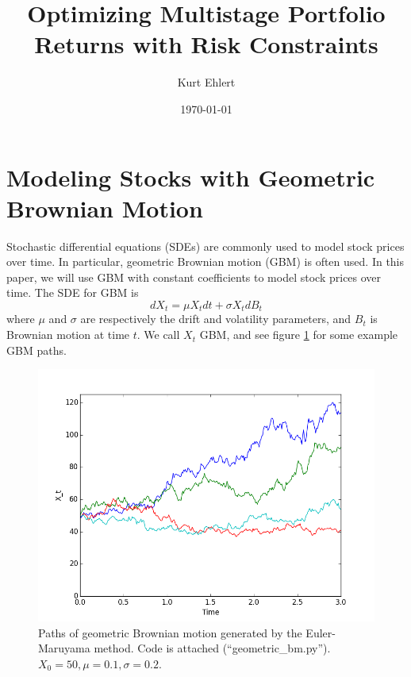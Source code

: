 \documentclass{amsart}
\title{Optimizing Multistage Portfolio Returns with Risk Constraints}
\author{Kurt Ehlert}
\date{\today}
\theoremstyle{definition}
\theoremstyle{remark}
\begin{document}
\maketitle

\tableofcontents

\section{Modeling Stocks with Geometric Brownian Motion}
Stochastic differential equations (SDEs) are commonly used to model stock prices over time. In particular,
geometric Brownian motion (GBM) is often used.\cite{hull} In this paper, we will use GBM with constant coefficients to model stock prices over time. The SDE for GBM is
\begin{equation}\label{eq:GBM_SDE}
dX_t = \mu X_t dt + \sigma X_t dB_t
\end{equation}
where $\mu$ and $\sigma$ are respectively the drift and volatility parameters, and $B_t$ is Brownian motion at time $t$. We call $X_t$ GBM, and see figure \ref{fig:mesh1} for some example GBM paths.

\begin{figure}
\centering
\includegraphics[scale=0.5]{geometric_bm.png}
\caption{Paths of geometric Brownian motion generated by the Euler-Maruyama method. Code is attached (``geometric\_bm.py''). $X_0 = 50, \mu=0.1, \sigma=0.2$.}
\label{fig:mesh1}
\end{figure}
\end{document}
